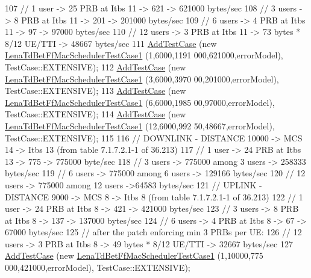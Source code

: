 \begin{DoxyCode}
107   \textcolor{comment}{// 1 user -> 25 PRB at Itbs 11 -> 621 -> 621000 bytes/sec}
108   \textcolor{comment}{// 3 users -> 8 PRB at Itbs 11 -> 201 -> 201000 bytes/sec}
109   \textcolor{comment}{// 6 users -> 4 PRB at Itbs 11 -> 97 -> 97000 bytes/sec}
110   \textcolor{comment}{// 12 users -> 3 PRB at Itbs 11 -> 73 bytes * 8/12 UE/TTI -> 48667 bytes/sec}
111   \hyperlink{classns3_1_1TestCase_a3718088e3eefd5d6454569d2e0ddd835}{AddTestCase} (\textcolor{keyword}{new} \hyperlink{classLenaTdBetFfMacSchedulerTestCase1}{LenaTdBetFfMacSchedulerTestCase1} (1,6000,1191
      000,621000,errorModel), TestCase::EXTENSIVE);
112   \hyperlink{classns3_1_1TestCase_a3718088e3eefd5d6454569d2e0ddd835}{AddTestCase} (\textcolor{keyword}{new} \hyperlink{classLenaTdBetFfMacSchedulerTestCase1}{LenaTdBetFfMacSchedulerTestCase1} (3,6000,3970
      00,201000,errorModel), TestCase::EXTENSIVE);
113   \hyperlink{classns3_1_1TestCase_a3718088e3eefd5d6454569d2e0ddd835}{AddTestCase} (\textcolor{keyword}{new} \hyperlink{classLenaTdBetFfMacSchedulerTestCase1}{LenaTdBetFfMacSchedulerTestCase1} (6,6000,1985
      00,97000,errorModel), TestCase::EXTENSIVE);
114   \hyperlink{classns3_1_1TestCase_a3718088e3eefd5d6454569d2e0ddd835}{AddTestCase} (\textcolor{keyword}{new} \hyperlink{classLenaTdBetFfMacSchedulerTestCase1}{LenaTdBetFfMacSchedulerTestCase1} (12,6000,992
      50,48667,errorModel), TestCase::EXTENSIVE);
115   
116   \textcolor{comment}{// DOWNLINK - DISTANCE 10000 -> MCS 14 -> Itbs 13 (from table 7.1.7.2.1-1 of 36.213)}
117   \textcolor{comment}{// 1 user -> 24 PRB at Itbs 13 -> 775 -> 775000 byte/sec}
118   \textcolor{comment}{// 3 users -> 775000 among 3 users -> 258333  bytes/sec}
119   \textcolor{comment}{// 6 users -> 775000 among 6 users -> 129166  bytes/sec}
120   \textcolor{comment}{// 12 users -> 775000 among 12 users ->64583  bytes/sec}
121   \textcolor{comment}{// UPLINK - DISTANCE 9000 -> MCS 8 -> Itbs 8 (from table 7.1.7.2.1-1 of 36.213)}
122   \textcolor{comment}{// 1 user -> 24 PRB at Itbs 8 -> 421 -> 421000 bytes/sec}
123   \textcolor{comment}{// 3 users -> 8 PRB at Itbs 8 -> 137 -> 137000 bytes/sec}
124   \textcolor{comment}{// 6 users -> 4 PRB at Itbs 8 -> 67 -> 67000 bytes/sec}
125   \textcolor{comment}{// after the patch enforcing min 3 PRBs per UE:}
126   \textcolor{comment}{// 12 users -> 3 PRB at Itbs 8 -> 49 bytes * 8/12 UE/TTI -> 32667 bytes/sec}
127   \hyperlink{classns3_1_1TestCase_a3718088e3eefd5d6454569d2e0ddd835}{AddTestCase} (\textcolor{keyword}{new} \hyperlink{classLenaTdBetFfMacSchedulerTestCase1}{LenaTdBetFfMacSchedulerTestCase1} (1,10000,775
      000,421000,errorModel), TestCase::EXTENSIVE);

\end{DoxyCode}
